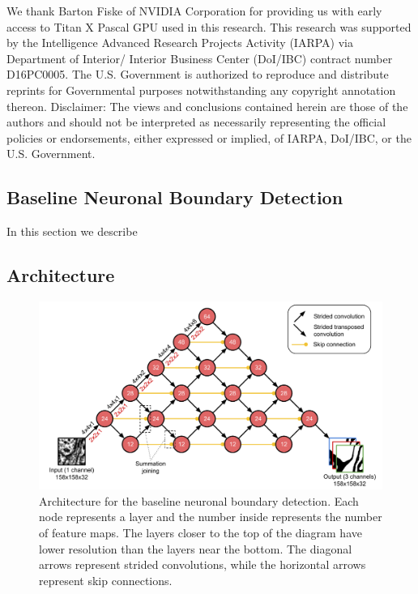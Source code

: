\documentclass{article}
\begin{document}
We thank Barton Fiske of NVIDIA Corporation for providing us with early access to Titan X
Pascal GPU used in this research. This research was supported by the Intelligence Advanced
Research Projects Activity (IARPA) via Department of Interior/ Interior Business Center (DoI/IBC)
contract number D16PC0005. The U.S. Government is authorized to reproduce and distribute reprints
for Governmental purposes notwithstanding any copyright annotation thereon. Disclaimer: The views
and conclusions contained herein are those of the authors and should not be interpreted as necessarily
representing the official policies or endorsements, either expressed or implied, of IARPA, DoI/IBC,
or the U.S. Government.



\newpage
\begin{appendices}

\section{Baseline Neuronal Boundary Detection}
\label{appendix:baseline}

In this section we describe

\subsection{Architecture}

\begin{figure}[!t]
\centering
\includegraphics[width=1.0\linewidth]{baseline.pdf}

\caption{Architecture for the baseline neuronal boundary detection. Each node represents a layer and the number inside represents the number of feature maps. The layers closer to the top of the diagram have lower resolution than the layers near the bottom. The diagonal arrows represent strided convolutions, while the horizontal arrows represent skip connections.}
\label{fig:architecture}
\end{figure}


\end{appendices}
\end{document}
